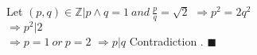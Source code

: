 \documentclass{article}
\begin{document}
\noindent Let $(p, q) \in \mathbb{Z} | p \land q = 1 \ and \ \frac{p}{q} = \sqrt{2}$
$\Rightarrow p^2 = 2q^2$ \\
$\Rightarrow p^2 | 2$\\
$\Rightarrow p = 1 \ or \ p = 2$
$\Rightarrow p | q $ Contradiction . $\blacksquare$
\end{document}
